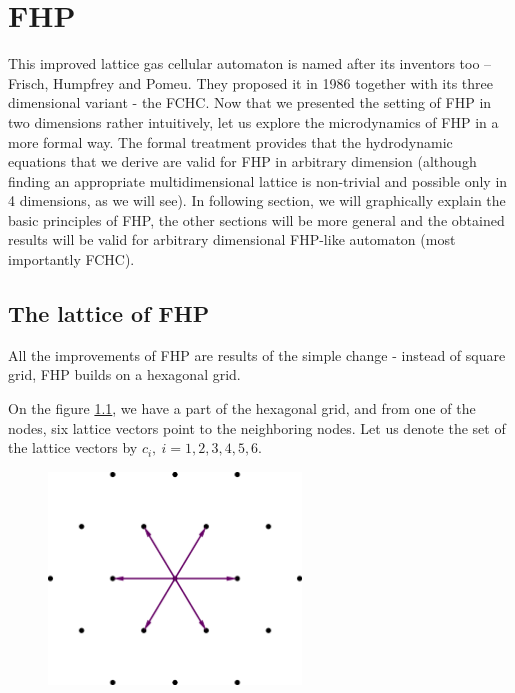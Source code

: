 \chapter{FHP}
This improved lattice gas cellular automaton is named after its inventors too -- Frisch, Humpfrey and Pomeu. 
They proposed it in 1986 together with its three dimensional variant - the FCHC. 
%
Now that we presented the setting of FHP in two dimensions rather intuitively, let us explore the microdynamics of FHP in a more formal way. The formal treatment provides that the hydrodynamic equations that we derive are valid for FHP in arbitrary dimension (although finding an appropriate multidimensional lattice is non-trivial and possible only in 4 dimensions, as we will see).
In following section, we will graphically explain the basic principles of FHP, the other sections will be more general and the obtained results will be valid for arbitrary dimensional FHP-like automaton (most importantly FCHC).

\section{The lattice of FHP}
All the improvements of FHP are results of the simple change - instead of square grid, FHP builds on a hexagonal grid. 

On the figure \ref{FHPgrid}, we have a part of the hexagonal grid, and from one of the nodes, six lattice vectors point to the neighboring nodes.
Let us denote the set of the lattice vectors by $c_i,~i=1,2,3,4,5,6$.


\begin{figure}[htbp] \label{FHPgrid}
 \centering
 \includegraphics[width=0.6\textwidth]{./img/fhp_desc}
\end{figure}

